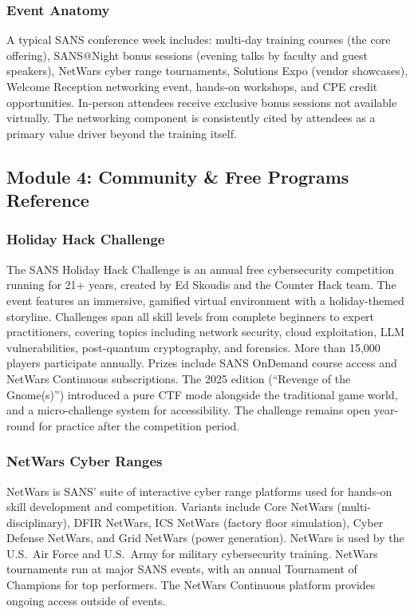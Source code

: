 \documentclass[11pt,letterpaper]{article}
\begin{document}
\subsubsection{Event Anatomy}

A typical SANS conference week includes: multi-day training courses (the core offering), SANS@Night bonus sessions (evening talks by faculty and guest speakers), NetWars cyber range tournaments, Solutions Expo (vendor showcases), Welcome Reception networking event, hands-on workshops, and CPE credit opportunities. In-person attendees receive exclusive bonus sessions not available virtually. The networking component is consistently cited by attendees as a primary value driver beyond the training itself.

\subsection{Module 4: Community \& Free Programs Reference}

\subsubsection{Holiday Hack Challenge}

The SANS Holiday Hack Challenge is an annual free cybersecurity competition running for 21+ years, created by Ed Skoudis and the Counter Hack team. The event features an immersive, gamified virtual environment with a holiday-themed storyline. Challenges span all skill levels from complete beginners to expert practitioners, covering topics including network security, cloud exploitation, LLM vulnerabilities, post-quantum cryptography, and forensics. More than 15,000 players participate annually. Prizes include SANS OnDemand course access and NetWars Continuous subscriptions. The 2025 edition (``Revenge of the Gnome(s)'') introduced a pure CTF mode alongside the traditional game world, and a micro-challenge system for accessibility. The challenge remains open year-round for practice after the competition period.

\subsubsection{NetWars Cyber Ranges}

NetWars is SANS' suite of interactive cyber range platforms used for hands-on skill development and competition. Variants include Core NetWars (multi-disciplinary), DFIR NetWars, ICS NetWars (factory floor simulation), Cyber Defense NetWars, and Grid NetWars (power generation). NetWars is used by the U.S.\ Air Force and U.S.\ Army for military cybersecurity training. NetWars tournaments run at major SANS events, with an annual Tournament of Champions for top performers. The NetWars Continuous platform provides ongoing access outside of events.
\end{document}
